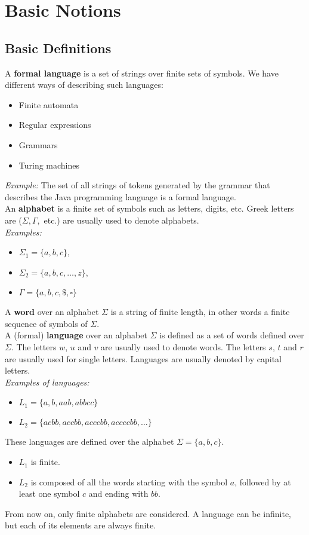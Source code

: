 \section{Basic Notions}
\subsection{Basic Definitions}
A \textbf{formal language} is a set of strings over finite sets of symbols.
We have different ways of describing such languages:
\begin{itemize}
  \item Finite automata
  \item Regular expressions
  \item Grammars
  \item Turing machines
\end{itemize}
\textit{Example:} The set of all strings of tokens generated by the grammar 
that describes the Java programming language is a formal language.\\

An \textbf{alphabet} is a finite set of symbols such as letters, digits, etc.
Greek letters are ($\Sigma, \Gamma,$ etc.) are usually used to denote alphabets.\\

\textit{Examples:}
\begin{itemize}
  \item $ \Sigma_1 = \{a,b,c\}$,
  \item $ \Sigma_2 = \{a,b,c,\dots,z\}$,
  \item $ \Gamma = \{a,b,c,\text{\$},\square\}$
\end{itemize}

A \textbf{word} over an alphabet $\Sigma$ is a string of finite length, 
in other words a finite sequence of symbols of $\Sigma$.\\

A (formal) \textbf{language} over an alphabet $\Sigma$ is defined as a 
set of words defined over $\Sigma$. The letters $w$, $u$ and $v$ are usually used to denote words.
The letters $s$, $t$ and $r$ are usually used for single letters. 
Languages are usually denoted by capital letters.\\

\textit{Examples of languages:}
\begin{itemize}
  \item $ L_1 = \{a,b,aab,abbcc\} $
  \item $ L_2 = \{acbb,accbb,acccbb,accccbb,\dots\}$
\end{itemize}
These languages are defined over the alphabet $\Sigma = \{a,b,c\}$.
\begin{itemize}
  \item $L_1$ is finite.
  \item $L_2$ is composed of all the words starting with the symbol $a$, 
  followed by at least one symbol $c$ and ending with $bb$.
\end{itemize}
From now on, only finite alphabets are considered. A language can be infinite, 
but each of its elements are always finite.

